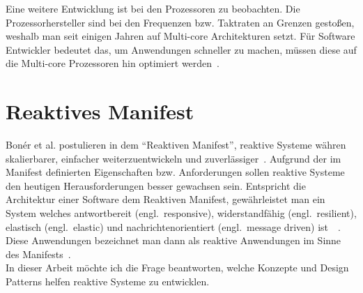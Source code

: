 Eine weitere Entwicklung ist bei den Prozessoren zu beobachten. Die Prozessorhersteller sind bei den Frequenzen bzw. Taktraten an Grenzen gestoßen, weshalb man seit einigen Jahren auf Multi-core Architekturen setzt. Für Software Entwickler bedeutet das, um Anwendungen schneller zu machen, müssen diese auf die Multi-core Prozessoren hin optimiert werden~\cite[S. 15]{butcher_seven_2014}.

\section{Reaktives Manifest}
Bonér et al. postulieren in dem \enquote{Reaktiven Manifest}, reaktive Systeme währen skalierbarer, einfacher weiterzuentwickeln und zuverlässiger~\cite{boner_reactive_2014}. Aufgrund der im Manifest definierten Eigenschaften bzw. Anforderungen sollen reaktive Systeme den heutigen Herausforderungen besser gewachsen sein. Entspricht die Architektur einer Software dem Reaktiven Manifest, gewährleistet man ein System welches antwortbereit (engl.\ responsive), widerstandfähig (engl.\ resilient), elastisch (engl.\ elastic) und nachrichtenorientiert (engl.\ message driven) ist~\cite[S.~5]{vernon_reactive_2016}~\cite{boner_reactive_2014}. Diese Anwendungen bezeichnet man dann als reaktive Anwendungen im Sinne des Manifests~\cite{boner_reactive_2014}.\\
In dieser Arbeit möchte ich die Frage beantworten, welche Konzepte und Design Patterns helfen reaktive Systeme zu entwicklen.
